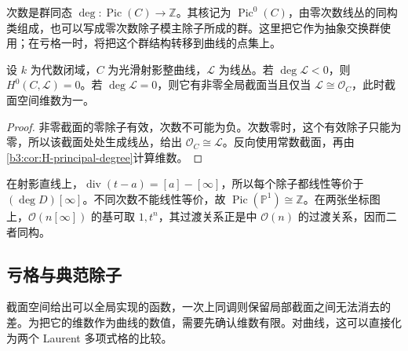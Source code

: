 \ProseParagraphBreak
次数是群同态 \(\deg:\operatorname{Pic}(C)\rightarrow\mathbb Z\)。其核记为 \(\operatorname{Pic}^0(C)\)，由零次数线丛的同构类组成，也可以写成零次数除子模主除子所成的群。这里把它作为抽象交换群使用；在亏格一时，将把这个群结构转移到曲线的点集上。

\begin{corollary}\label{b3:cor:H-section-degree}
	设 \(k\) 为代数闭域，\(C\) 为光滑射影整曲线，\(\mathcal L\) 为线丛。若 \(\deg\mathcal L<0\)，则 \(H^0(C,\mathcal L)=0\)。若 \(\deg\mathcal L=0\)，则它有非零全局截面当且仅当 \(\mathcal L\cong\mathcal O_C\)，此时截面空间维数为一。
\end{corollary}
\begin{proof}
	非零截面的零除子有效，次数不可能为负。次数零时，这个有效除子只能为零，所以该截面处处生成线丛，给出 \(\mathcal O_C\cong\mathcal L\)。反向使用常数截面，再由\cref{b3:cor:H-principal-degree}计算维数。
\end{proof}

在射影直线上，\(\operatorname{div}(t-a)=[a]-[\infty]\)，所以每个除子都线性等价于 \((\deg D)[\infty]\)。不同次数不能线性等价，故 \(\operatorname{Pic}(\mathbb P^1)\cong\mathbb Z\)。在两张坐标图上，\(\mathcal O(n[\infty])\) 的基可取 \(1,t^n\)，其过渡关系正是中 \(\mathcal O(n)\) 的过渡关系，因而二者同构。

\subsection{亏格与典范除子}
\label{b3:subsec:H01:03}

截面空间给出可以全局实现的函数，一次上同调则保留局部截面之间无法消去的差。为把它的维数作为曲线的数值，需要先确认维数有限。对曲线，这可以直接化为两个 Laurent 多项式格的比较。

